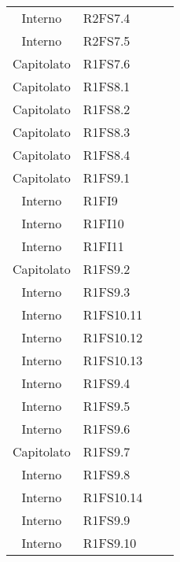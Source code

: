 {\begin{longtable}{ c C{4cm} c c}
Interno & R2FS7.4\\

Interno & R2FS7.5\\

Capitolato & R1FS7.6\\

Capitolato & R1FS8.1\\


Capitolato & R1FS8.2\\

Capitolato & R1FS8.3\\

Capitolato & R1FS8.4\\

Capitolato & R1FS9.1\\

Interno & R1FI9\\

Interno & R1FI10\\

Interno & R1FI11\\

Capitolato & R1FS9.2\\


Interno & R1FS9.3\\

Interno & R1FS10.11\\

Interno & R1FS10.12\\

Interno & R1FS10.13\\

Interno & R1FS9.4\\

Interno & R1FS9.5\\

Interno & R1FS9.6\\

Capitolato & R1FS9.7\\

Interno & R1FS9.8\\


Interno & R1FS10.14\\

Interno & R1FS9.9\\

Interno & R1FS9.10\\


\end{longtable}}
